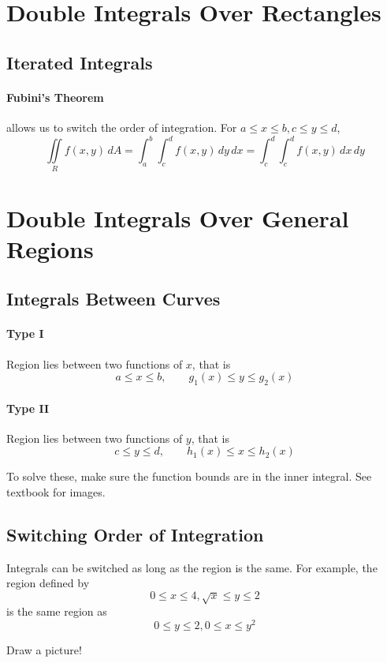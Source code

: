 \documentclass{report}  %
\begin{document}
\setcounter{chapter}{15}
\section{Double Integrals Over Rectangles}
\subsection*{Iterated Integrals}
\paragraph{Fubini's Theorem} 
allows us to switch the order of integration. For $a \le x \le b, c \le y \le d$,
\begin{equation}
	\iint \limits_R f(x,y) \, dA = 
	\int_a^b \int_c^d f(x,y) \, dy \, dx =
	\int_c^d \int_c^d f(x,y) \, dx \, dy
\end{equation}

\section{Double Integrals Over General Regions}
\subsection*{Integrals Between Curves}
\paragraph{Type I} Region lies between two functions of $x$, that is 
$$a \le x \le b, \qquad g_1(x) \le y \le g_2(x)$$

\paragraph{Type II} Region lies between two functions of $y$, that is 
$$c \le y \le d, \qquad h_1(x) \le x \le h_2(x)$$

To solve these, make sure the function bounds are in the inner integral. 
See textbook for images.

\subsection*{Switching Order of Integration}
Integrals can be switched as long as the region is the same. 
For example, the region defined by $$0 \le x \le 4, \sqrt{x} \le y \le 2$$ is the same region as $$0 \le y \le 2, 0 \le x \le y^2$$

Draw a picture!
\end{document}
